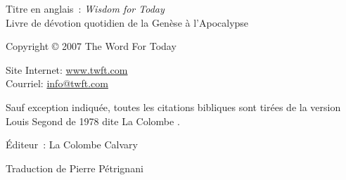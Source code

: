 \newpage
\mbox{}
\vfill
\noindent Titre en anglais~: \emph{Wisdom for Today}\\
Livre de dévotion quotidien de la Genèse à l'Apocalypse

\noindent Copyright \copyright{} 2007 The Word For Today

\noindent Site Internet: \url{www.twft.com}\\
\noindent Courriel: \url{info@twft.com}

\noindent Sauf exception indiquée, toutes les citations bibliques sont tirées de
 la version Louis Segond de 1978 dite \og La Colombe \fg{}.


\noindent Éditeur~: La Colombe Calvary

\noindent Traduction de Pierre Pétrignani

